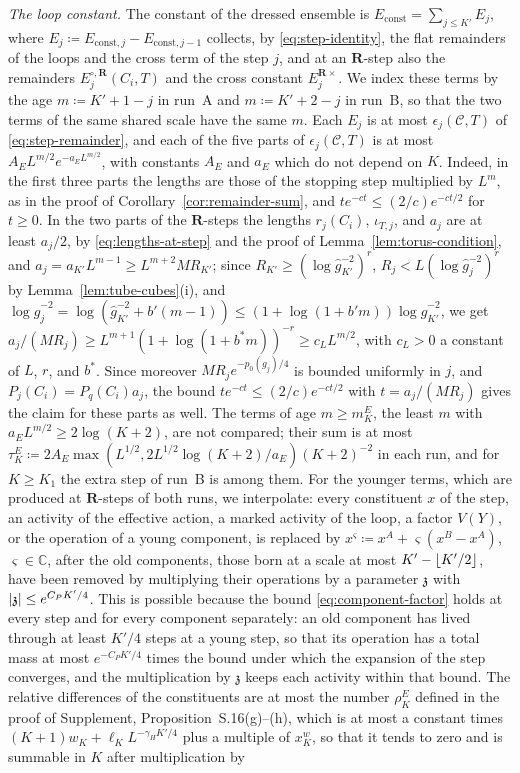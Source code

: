 \documentclass[11pt]{preprint}
\DeclarePairedDelimiter{\abs}{\lvert}{\rvert}
\DeclarePairedDelimiter{\floor}{\lfloor}{\rfloor}
\numberwithin{equation}{section}
\theoremstyle{definition}
\theoremstyle{remark}
\theoremstyle{plain}
\begin{document}
\emph{The loop constant.} The constant of the dressed ensemble is $E_{\mathrm{const}} = \sum_{j \leq K'}E_j$, where $E_j \coloneqq E_{\mathrm{const},j} - E_{\mathrm{const},j-1}$ collects, by \eqref{eq:step-identity}, the flat remainders of the loops and the cross term of the step $j$, and at an $\mathbf R$-step also the remainders $E^{\circ,\mathbf R}_j(C_i, T)$ and the cross constant $E^{\mathbf R\times}_j$. We index these terms by the age $m \coloneqq K' + 1 - j$ in run~A and $m \coloneqq K' + 2 - j$ in run~B, so that the two terms of the same shared scale have the same $m$. Each $E_j$ is at most $\epsilon_j(\mathcal C, T)$ of \eqref{eq:step-remainder}, and each of the five parts of $\epsilon_j(\mathcal C, T)$ is at most $A_EL^{m/2}e^{-a_EL^{m/2}}$, with constants $A_E$ and $a_E$ which do not depend on $K$. Indeed, in the first three parts the lengths are those of the stopping step multiplied by $L^m$, as in the proof of Corollary~\ref{cor:remainder-sum}, and $te^{-ct} \leq (2/c)e^{-ct/2}$ for $t \geq 0$. In the two parts of the $\mathbf R$-steps the lengths $r_j(C_i)$, $\iota_{T,j}$, and $a_j$ are at least $a_j/2$, by \eqref{eq:lengths-at-step} and the proof of Lemma~\ref{lem:torus-condition}, and $a_j = a_{K'}L^{m-1} \geq L^{m+2}MR_{K'}$; since $R_{K'} \geq (\log\hat g_{K'}^{-2})^r$, $R_j < L(\log\hat g_j^{-2})^r$ by Lemma~\ref{lem:tube-cubes}(i), and $\log\hat g_j^{-2} = \log(\hat g_{K'}^{-2} + b'(m - 1)) \leq (1 + \log(1 + b'm))\log\hat g_{K'}^{-2}$, we get $a_j/(MR_j) \geq L^{m+1}(1 + \log(1 + b^*m))^{-r} \geq c_LL^{m/2}$, with $c_L > 0$ a constant of $L$, $r$, and $b^*$. Since moreover $MR_je^{-p_0(g_j)/4}$ is bounded uniformly in $j$, and $P_j(C_i) = P_q(C_i)a_j$, the bound $te^{-ct} \leq (2/c)e^{-ct/2}$ with $t = a_j/(MR_j)$ gives the claim for these parts as well. The terms of age $m \geq m^E_K$, the least $m$ with $a_EL^{m/2} \geq 2\log(K + 2)$, are not compared; their sum is at most $\tau^E_K \coloneqq 2A_E\max(L^{1/2}, 2L^{1/2}\log(K + 2)/a_E)(K + 2)^{-2}$ in each run, and for $K \geq K_1$ the extra step of run~B is among them. For the younger terms, which are produced at $\mathbf R$-steps of both runs, we interpolate: every constituent $x$ of the step, an activity of the effective action, a marked activity of the loop, a factor $V(Y)$, or the operation of a young component, is replaced by $x^\varsigma \coloneqq x^A + \varsigma(x^B - x^A)$, $\varsigma \in \mathbb C$, after the old components, those born at a scale at most $K' - \floor{K'/2}$, have been removed by multiplying their operations by a parameter $\mathfrak z$ with $\abs{\mathfrak z} \leq e^{C_PK'/4}$. This is possible because the bound \eqref{eq:component-factor} holds at every step and for every component separately: an old component has lived through at least $K'/4$ steps at a young step, so that its operation has a total mass at most $e^{-C_PK'/4}$ times the bound under which the expansion of the step converges, and the multiplication by $\mathfrak z$ keeps each activity within that bound. The relative differences of the constituents are at most the number $\rho^E_K$ defined in the proof of Supplement, Proposition~S.16(g)--(h), which is at most a constant times $(K + 1)w_K + \ell_KL^{-\gamma_HK'/4}$ plus a multiple of $x^w_K$, so that it tends to zero and is summable in $K$ after multiplication by 
\end{document}
